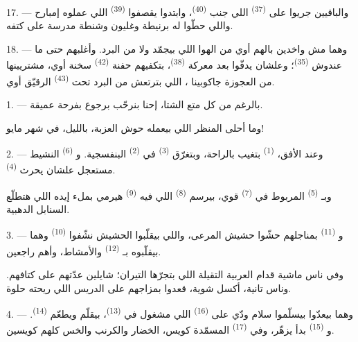17. --- والباقيين جريوا على  \textsuperscript{(37)} اللي جنب
 \textsuperscript{(40)}، وابتدوا يقصفوا 
\textsuperscript{(39)} اللي عملوه إمبارح واللي حطّوا له برنيطة وغليون وشنطة مدرسة
على كتفه.

18. --- وهما مش واخدين بالهم أوي من الهوا اللي بيجمّد ولا من البرد. وأغلبهم
حتى ما عندوش  \textsuperscript{(35)}؛ وعلشان يدفّوا بعد معركة
 \textsuperscript{(38)}، بتكفيهم حفنة 
\textsuperscript{(42)} سخنة أوي، مشتريينها من العجوزة جاكوبينا ،
اللي بترتعش من البرد تحت  \textsuperscript{(43)} الرقيّق أوي.

\VUsaut{3.0mm}
\VUsaut{3.0mm}

\VUsaut{4.0mm}

1. --- بالرغم من كل متع الشتا، إحنا بنرحّب برجوع  بفرحة عميقة.

وما أحلى المنظر اللي بيعمله حوش العزبة، بالليل، في شهر مايو!

2. --- وعند الأفق،  \textsuperscript{(1)} بتغيب بالراحة، وبتغرّق
 \textsuperscript{(3)} في  \textsuperscript{(2)} البنفسجية.
و \textsuperscript{(6)} النشيط مستعجل علشان يحرث 
\textsuperscript{(4)}.

وبـ \textsuperscript{(5)} المربوط في  \textsuperscript{(7)} قوي،
بيرسم  \textsuperscript{(8)} اللي فيه  \textsuperscript{(9)}
هيرمي بملء إيده  اللي هتطلّع السنابل الدهبية.

3. --- و \textsuperscript{(11)} بمناجلهم حشّوا حشيش المرعى،
واللي بيقلّبوا الحشيش نشّفوا  \textsuperscript{(10)} وهما بيقلّبوه
بـ \textsuperscript{(12)} والأمشاط، وأهم راجعين.

وفي ناس ماشية قدام العربية التقيلة اللي بتجرّها التيران؛ شايلين عدّتهم على
كتافهم. وناس تانية، أكسل شوية، قعدوا بمزاجهم على الدريس اللي ريحته حلوة.

4. --- وهما بيعدّوا بيسلّموا سلام ودّي على  \textsuperscript{(16)}
اللي مشغول في  \textsuperscript{(13)}، بيقلّم  ويطعّم  \textsuperscript{(14)}. و
\textsuperscript{(15)} بدأ يزهّر، وفي  \textsuperscript{(17)}
المسمّدة كويس، الخضار والكرنب والخس كلهم كويسين.

